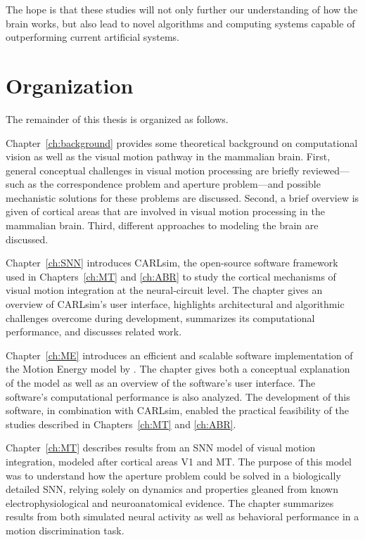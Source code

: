 The hope is that these studies will not only further our understanding of
how the brain works, but also lead to novel algorithms and computing systems
capable of outperforming current artificial systems.


\section{Organization}

The remainder of this thesis is organized as follows.

Chapter~\ref{ch:background} provides some theoretical background on computational
vision as well as the visual motion pathway in the mammalian brain.
First, general conceptual challenges in visual motion processing are briefly 
reviewed---such as the correspondence problem and aperture problem---and
possible mechanistic solutions for these problems are discussed.
Second, a brief overview is given  of cortical areas 
that are involved in visual motion processing in the mammalian brain.
Third, different approaches to modeling the brain are discussed.

Chapter~\ref{ch:SNN} introduces CARLsim, the open-source software framework
used in Chapters~\ref{ch:MT} and \ref{ch:ABR} to study the
cortical mechanisms of visual motion integration at the neural-circuit level.
The chapter gives an overview of CARLsim's user interface,
highlights architectural and algorithmic challenges overcome during development,
summarizes its computational performance, and discusses related work.

Chapter~\ref{ch:ME} introduces an efficient and scalable software implementation 
of the Motion Energy model by \cite{SimoncelliHeeger1998}.
The chapter gives both a conceptual explanation of the model as well as an overview
of the software's user interface.
The software's computational performance is also analyzed.
The development of this software, in combination with CARLsim, enabled the
practical feasibility of the studies described in Chapters~\ref{ch:MT} and
\ref{ch:ABR}.

Chapter~\ref{ch:MT} describes results from an \ac{SNN} model of visual motion
integration, modeled after cortical areas \ac{V1} and \ac{MT}.
The purpose of this model was to understand how the aperture problem could be
solved in a biologically detailed \ac{SNN},
relying solely on dynamics and properties gleaned from known electrophysiological
and neuroanatomical evidence.
The chapter summarizes results from both simulated neural activity as well as
behavioral performance in a motion discrimination task.

